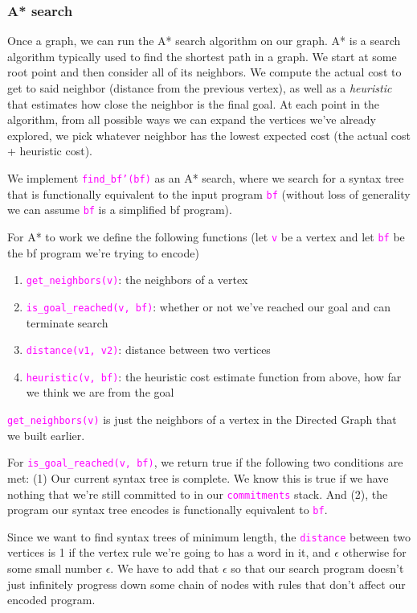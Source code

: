 \documentclass[runningheads]{llncs}
\newcommand{\code}[1]{\texttt{\textcolor{magenta}{\setlength{\fboxsep}{1pt}\colorbox{lightgray!20}{#1}}}}
\begin{document}
\subsubsection*{A* search}
Once a graph, we can run the A* search algorithm on our graph. A* is a search algorithm typically used to find the shortest path in a graph. We start at some root point and then consider all of its neighbors. We compute the actual cost to get to said neighbor (distance from the previous vertex), as well as a \textit{heuristic} that estimates how close the neighbor is the final goal. At each point in the algorithm, from all possible ways we can expand the vertices we've already explored, we pick whatever neighbor has the lowest expected cost (the actual cost + heuristic cost).

We implement \code{find\_bf'(bf)} as an A* search, where we search for a syntax tree that is functionally equivalent to the input program \code{bf} (without loss of generality we can assume \code{bf} is a simplified bf program).

For A* to work we define the following functions (let \code{v}  be a vertex and let \code{bf}  be the bf program we're trying to encode)
\begin{enumerate}
	\item \code{get\_neighbors(v)}: the neighbors of a vertex
	\item \code{is\_goal\_reached(v, bf)}: whether or not we've reached our goal and can terminate search
	\item \code{distance(v1, v2)}: distance between two vertices
	\item \code{heuristic(v, bf)}: the heuristic cost estimate function from above, how far we think we are from the goal
\end{enumerate}


\code{get\_neighbors(v)} is just the neighbors of a vertex in the Directed Graph that we built earlier.

For \code{is\_goal\_reached(v, bf)}, we return true if the following two conditions are met: (1) Our current syntax tree is complete. We know this is true if we have nothing that we're still committed to in our \code{commitments} stack. And (2), the program our syntax tree encodes is functionally equivalent to \code{bf}.

Since we want to find syntax trees of minimum length, the \code{distance} between two vertices is 1 if the vertex rule we're going to has a word in it, and $\epsilon$ otherwise for some small number $\epsilon$. We have to add that $\epsilon$ so that our search program doesn't just infinitely progress down some chain of nodes with rules that don't affect our encoded program.
\end{document}
